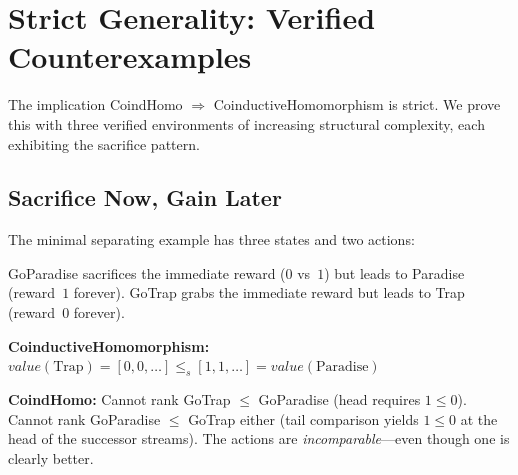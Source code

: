 \documentclass[9pt,a4paper]{article}
\theoremstyle{plain}
\theoremstyle{definition}
\theoremstyle{remark}
\begin{document}

\section{Strict Generality: Verified Counterexamples}\label{sec:strict-generality}

The implication CoindHomo $\Rightarrow$ CoinductiveHomomorphism is strict.  We prove this with three verified environments of increasing structural complexity, each exhibiting the sacrifice pattern.

\subsection{Sacrifice Now, Gain Later}

The minimal separating example has three states and two actions:

\begin{center}
\end{center}

GoParadise sacrifices the immediate reward ($0$ vs~$1$) but leads to Paradise (reward~$1$ forever).  GoTrap grabs the immediate reward but leads to Trap (reward~$0$ forever).

\textbf{CoinductiveHomomorphism:} $\mathit{value}(\text{Trap}) = [0,0,\ldots] \le_s [1,1,\ldots] = \mathit{value}(\text{Paradise})$ \checkmark

\textbf{CoindHomo:} Cannot rank GoTrap $\le$ GoParadise (head requires $1 \le 0$). Cannot rank GoParadise $\le$ GoTrap either (tail comparison yields $1 \le 0$ at the head of the successor streams). The actions are \emph{incomparable}---even though one is clearly better.
\end{document}
